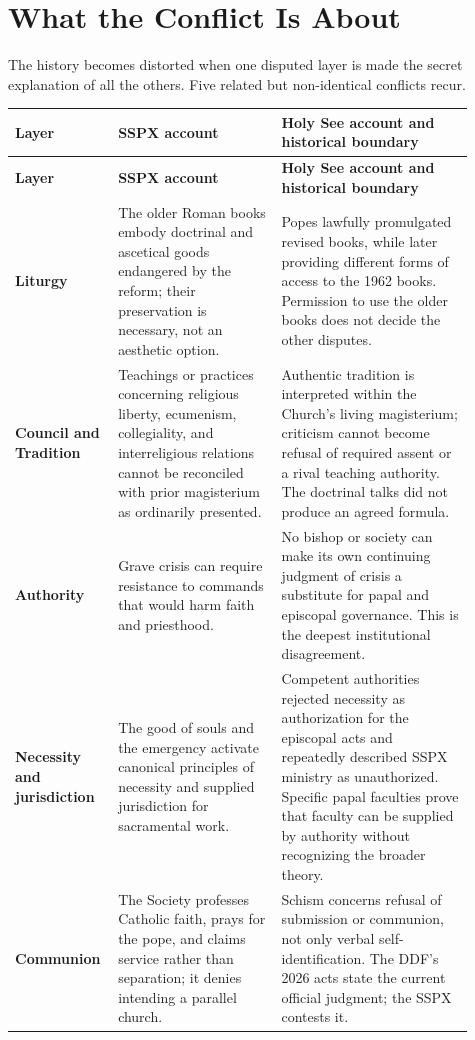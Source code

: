 \section{What the Conflict Is About}

The history becomes distorted when one disputed layer is made the secret explanation of all the others. Five related but non-identical conflicts recur.

\begin{longtable}{>{\bfseries\RaggedRight\arraybackslash}p{0.17\linewidth}>{\RaggedRight\arraybackslash}p{0.34\linewidth}>{\RaggedRight\arraybackslash}p{0.40\linewidth}}
\toprule
\textbf{Layer} & \textbf{SSPX account} & \textbf{Holy See account and historical boundary}\\
\midrule
\endfirsthead
\toprule
\textbf{Layer} & \textbf{SSPX account} & \textbf{Holy See account and historical boundary}\\
\midrule
\endhead
\bottomrule
\endfoot
Liturgy & The older Roman books embody doctrinal and ascetical goods endangered by the reform; their preservation is necessary, not an aesthetic option. & Popes lawfully promulgated revised books, while later providing different forms of access to the 1962 books. Permission to use the older books does not decide the other disputes.\\
Council and Tradition & Teachings or practices concerning religious liberty, ecumenism, collegiality, and interreligious relations cannot be reconciled with prior magisterium as ordinarily presented. & Authentic tradition is interpreted within the Church's living magisterium; criticism cannot become refusal of required assent or a rival teaching authority. The doctrinal talks did not produce an agreed formula.\\
Authority & Grave crisis can require resistance to commands that would harm faith and priesthood. & No bishop or society can make its own continuing judgment of crisis a substitute for papal and episcopal governance. This is the deepest institutional disagreement.\\
Necessity and jurisdiction & The good of souls and the emergency activate canonical principles of necessity and supplied jurisdiction for sacramental work. & Competent authorities rejected necessity as authorization for the episcopal acts and repeatedly described SSPX ministry as unauthorized. Specific papal faculties prove that faculty can be supplied by authority without recognizing the broader theory.\\
Communion & The Society professes Catholic faith, prays for the pope, and claims service rather than separation; it denies intending a parallel church. & Schism concerns refusal of submission or communion, not only verbal self-identification. The DDF's 2026 acts state the current official judgment; the SSPX contests it.\\
\end{longtable}

